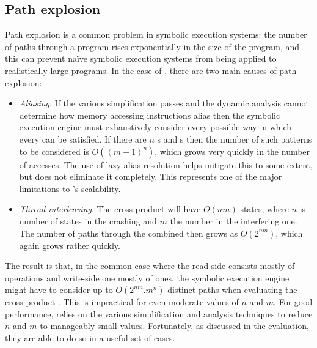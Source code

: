 
\subsection{Path explosion}

Path explosion is a common problem in symbolic execution systems: the
number of paths through a program rises exponentially in the size of
the program, and this can prevent na\"ive symbolic execution systems
from being applied to realistically large programs.  In the case of
\technique, there are two main causes of path explosion:
\begin{itemize}
\item
  \textit{Aliasing}.  If the various simplification passes and the
  dynamic analysis cannot determine how memory accessing instructions
  alias then the symbolic execution engine must exhaustively consider
  every possible way in which every  can be satisfied.  If
  there are $n$ s and s then the number of
  such patterns to be considered is $O((m+1)^n)$, which grows very
  quickly in the number of accesses.  The use of lazy alias resolution
  helps mitigate this to some extent, but does not eliminate it
  completely.  This represents one of the major limitations to
  \technique's scalability.
\item
  \textit{Thread interleaving}.  The cross-product {\StateMachine}
  will have $O(nm)$ states, where $n$ is number of states in the
  crashing {\StateMachine} and $m$ the number in the interfering one.
  The number of paths through the combined {\StateMachine} then grows
  as $O(2^{nm})$, which again grows rather quickly.
\end{itemize}
The result is that, in the common case where the read-side
{\StateMachine} consists mostly of  operations and
write-side one mostly of  ones, the symbolic execution
engine might have to consider up to $O(2^{nm}.m^n)$ distinct
paths  when evaluating
the cross-product {\StateMachine}.  This is impractical for even
moderate values of $n$ and $m$.  For good performance, {\technique}
relies on the various simplification and analysis techniques to reduce
$n$ and $m$ to manageably small values.  Fortunately, as discussed in
the evaluation, they are able to do so in a useful set of cases.

